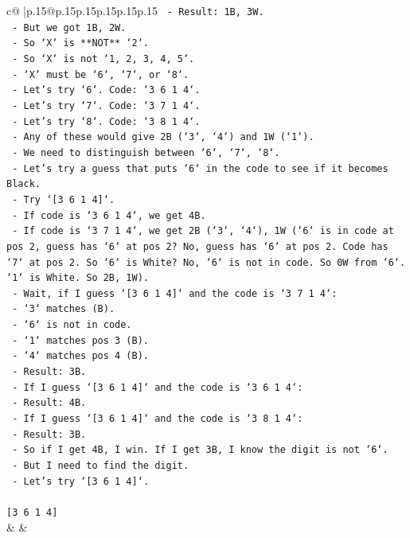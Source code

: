 \documentclass{article}
\begin{document}
{\begin{supertabular}{c@{$\;$}|p{.15\linewidth}@{}p{.15\linewidth}p{.15\linewidth}p{.15\linewidth}p{.15\linewidth}p{.15\linewidth}}
{{{\texttt{      {-} Result: 1B, 3W.} \\
\texttt{      {-} But we got 1B, 2W.} \\
\texttt{      {-} So `X` is **NOT** `2`.} \\
\texttt{  {-} So `X` is not `1, 2, 3, 4, 5`.} \\
\texttt{  {-} `X` must be `6`, `7`, or `8`.} \\
\texttt{  {-} Let's try `6`. Code: `3 6 1 4`.} \\
\texttt{  {-} Let's try `7`. Code: `3 7 1 4`.} \\
\texttt{  {-} Let's try `8`. Code: `3 8 1 4`.} \\
\texttt{  {-} Any of these would give 2B (`3`, `4`) and 1W (`1`).} \\
\texttt{  {-} We need to distinguish between `6`, `7`, `8`.} \\
\texttt{  {-} Let's try a guess that puts `6` in the code to see if it becomes Black.} \\
\texttt{  {-} Try `{[}3 6 1 4{]}`.} \\
\texttt{    {-} If code is `3 6 1 4`, we get 4B.} \\
\texttt{    {-} If code is `3 7 1 4`, we get 2B (`3`, `4`), 1W (`6` is in code at pos 2, guess has `6` at pos 2? No, guess has `6` at pos 2. Code has `7` at pos 2. So `6` is White? No, `6` is not in code. So 0W from `6`. `1` is White. So 2B, 1W).} \\
\texttt{    {-} Wait, if I guess `{[}3 6 1 4{]}` and the code is `3 7 1 4`:} \\
\texttt{      {-} `3` matches (B).} \\
\texttt{      {-} `6` is not in code.} \\
\texttt{      {-} `1` matches pos 3 (B).} \\
\texttt{      {-} `4` matches pos 4 (B).} \\
\texttt{      {-} Result: 3B.} \\
\texttt{    {-} If I guess `{[}3 6 1 4{]}` and the code is `3 6 1 4`:} \\
\texttt{      {-} Result: 4B.} \\
\texttt{    {-} If I guess `{[}3 6 1 4{]}` and the code is `3 8 1 4`:} \\
\texttt{      {-} Result: 3B.} \\
\texttt{  {-} So if I get 4B, I win. If I get 3B, I know the digit is not `6`.} \\
\texttt{  {-} But I need to find the digit.} \\
\texttt{  {-} Let's try `{[}3 6 1 4{]}`.} \\
\\ 
\texttt{{[}3 6 1 4{]}} \\
            }
        }
    }
    & & \\ \\


\end{supertabular}}
\end{document}
